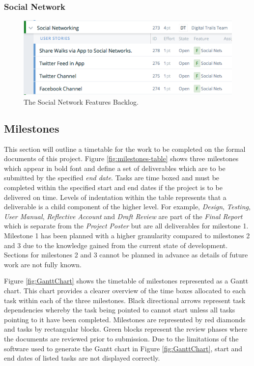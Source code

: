 \documentclass[11pt,a4paper]{article}
\begin{document}
\subsubsection{Social Network}
\begin{figure}[H]
\centering
\includegraphics[width = 140mm]{backlog/Social.png}
\caption{The Social Network Features Backlog.}
\label{fig:backlogSoci}
\end{figure}

\subsection{Milestones}
\label{sec:plan-milestones}

This section will outline a timetable for the work to be completed on the formal documents of this project. Figure \ref{fig:milestones-table} shows three milestones which appear in bold font and define a set of deliverables which are to be submitted by the specified \emph{end date}. Tasks are time boxed and must be completed within the specified start and end dates if the project is to be delivered on time. Levels of indentation within the table represents that a deliverable is a child component of the higher level. For example, \emph{Design}, \emph{Testing}, \emph{User Manual}, \emph{Reflective Account} and \emph{Draft Review} are part of the \emph{Final Report} which is separate from the \emph{Project Poster} but are all deliverables for milestone 1. Milestone 1 has been planned with a higher granularity compared to milestones 2 and 3 due to the knowledge gained from the current state of development. Sections for milestones 2 and 3 cannot be planned in advance as details of future work are not fully known.

Figure \ref{fig:GanttChart} shows the timetable of milestones represented as a Gantt chart. This chart provides a clearer overview of the time boxes allocated to each task within each of the three milestones. Black directional arrows represent task dependencies whereby the task being pointed to cannot start unless all tasks pointing to it have been completed. Milestones are represented by red diamonds and tasks by rectangular blocks. Green blocks represent the review phases where the documents are reviewed prior to submission. Due to the limitations of the software used to generate the Gantt chart in Figure \ref{fig:GanttChart}, start and end dates of listed tasks are not displayed correctly.
\end{document}
